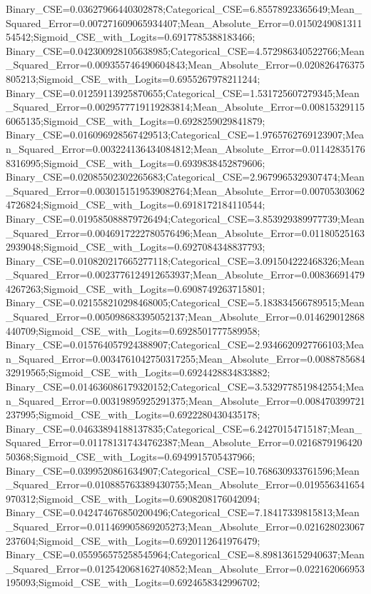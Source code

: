 Binary_CSE=0.03627966440302878;Categorical_CSE=6.85578923365649;Mean_Squared_Error=0.007271609065934407;Mean_Absolute_Error=0.015024908131154542;Sigmoid_CSE_with_Logits=0.6917785388183466;
Binary_CSE=0.042300928105638985;Categorical_CSE=4.572986340522766;Mean_Squared_Error=0.009355746490604843;Mean_Absolute_Error=0.020826476375805213;Sigmoid_CSE_with_Logits=0.6955267978211244;
Binary_CSE=0.01259113925870655;Categorical_CSE=1.531725607279345;Mean_Squared_Error=0.0029577719119283814;Mean_Absolute_Error=0.008153291156065135;Sigmoid_CSE_with_Logits=0.6928259029841879;
Binary_CSE=0.016096928567429513;Categorical_CSE=1.9765762769123907;Mean_Squared_Error=0.003224136434084812;Mean_Absolute_Error=0.011428351768316995;Sigmoid_CSE_with_Logits=0.6939838452879606;
Binary_CSE=0.02085502302265683;Categorical_CSE=2.9679965329307474;Mean_Squared_Error=0.0030151519539082764;Mean_Absolute_Error=0.007053030624726824;Sigmoid_CSE_with_Logits=0.6918172184110544;
Binary_CSE=0.019585088879726494;Categorical_CSE=3.853929389977739;Mean_Squared_Error=0.0046917222780576496;Mean_Absolute_Error=0.011805251632939048;Sigmoid_CSE_with_Logits=0.6927084348837793;
Binary_CSE=0.010820217665277118;Categorical_CSE=3.091504222468326;Mean_Squared_Error=0.0023776124912653937;Mean_Absolute_Error=0.008366914794267263;Sigmoid_CSE_with_Logits=0.6908749263715801;
Binary_CSE=0.021558210298468005;Categorical_CSE=5.183834566789515;Mean_Squared_Error=0.005098683395052137;Mean_Absolute_Error=0.014629012868440709;Sigmoid_CSE_with_Logits=0.6928501777589958;
Binary_CSE=0.015764057924388907;Categorical_CSE=2.9346620927766103;Mean_Squared_Error=0.0034761042750317255;Mean_Absolute_Error=0.008878568432919565;Sigmoid_CSE_with_Logits=0.6924428834833882;
Binary_CSE=0.014636086179320152;Categorical_CSE=3.5329778519842554;Mean_Squared_Error=0.00319895925291375;Mean_Absolute_Error=0.008470399721237995;Sigmoid_CSE_with_Logits=0.6922280430435178;
Binary_CSE=0.04633894188137835;Categorical_CSE=6.24270154715187;Mean_Squared_Error=0.011781317434762387;Mean_Absolute_Error=0.021687919642050368;Sigmoid_CSE_with_Logits=0.6949915705437966;
Binary_CSE=0.0399520861634907;Categorical_CSE=10.768630933761596;Mean_Squared_Error=0.010885763389430755;Mean_Absolute_Error=0.019556341654970312;Sigmoid_CSE_with_Logits=0.6908208176042094;
Binary_CSE=0.042474676850200496;Categorical_CSE=7.18417339815813;Mean_Squared_Error=0.011469905869205273;Mean_Absolute_Error=0.021628023067237604;Sigmoid_CSE_with_Logits=0.6920112641976479;
Binary_CSE=0.055956575258545964;Categorical_CSE=8.898136152940637;Mean_Squared_Error=0.012542068162740852;Mean_Absolute_Error=0.022162066953195093;Sigmoid_CSE_with_Logits=0.6924658342996702;
